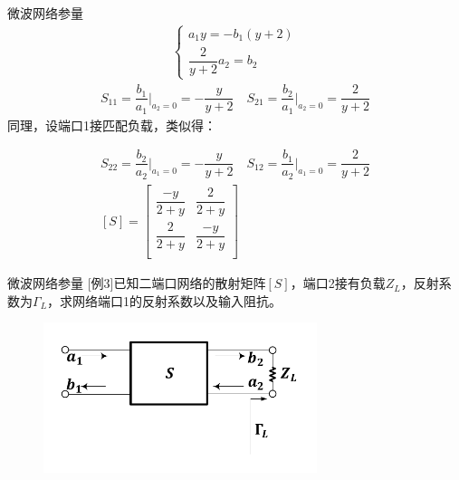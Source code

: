 \begin{frame}{微波网络参量}
    \begin{gather*}
        \begin{cases}
            a_1 y=-b_1(y+2) \\
            \dfrac{2}{y+2}a_2=b_2
        \end{cases}
    \end{gather*}
    \begin{gather*}
        S_{11}=\dfrac{b_1}{a_1}\bigg|_{a_2=0}=-\dfrac{y}{y+2}\quad
        S_{21}=\dfrac{b_2}{a_1}\bigg|_{a_2=0}=\dfrac{2}{y+2}
    \end{gather*}
    同理，设端口1接匹配负载，类似得：

    \begin{gather*}
        S_{22}=\dfrac{b_2}{a_2}\bigg|_{a_1=0}=-\dfrac{y}{y+2}\quad
        S_{12}=\dfrac{b_1}{a_2}\bigg|_{a_1=0}=\dfrac{2}{y+2}\\
        [S]=
        \begin{bmatrix*}
            \dfrac{-y}{2+y} & \dfrac{2}{2+y} \\
            \dfrac{2}{2+y} & \dfrac{-y}{2+y} \\
        \end{bmatrix*}
    \end{gather*}
\end{frame}

\begin{frame}{微波网络参量}
    [例3]\quad 已知二端口网络的散射矩阵$[S]$，端口2接有负载$Z_L$，反射系数为$\Gamma_L$，求网络端口1的反射系数以及输入阻抗。
    \begin{figure}
        \includegraphics[width=8cm]{Cha5//fig5-16.pdf}
    \end{figure}
\end{frame}

